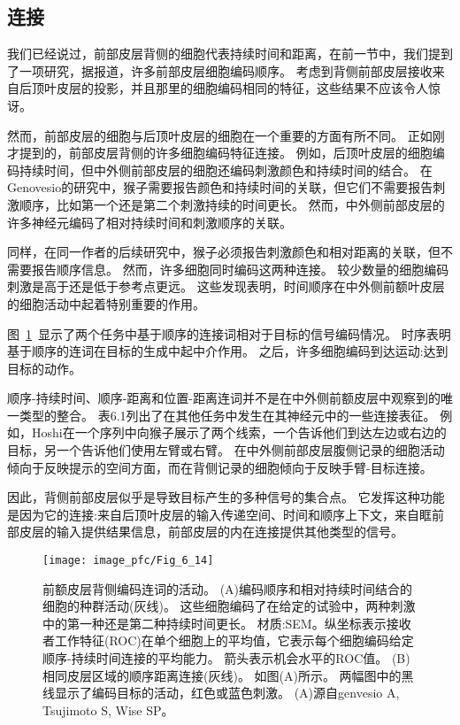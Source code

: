 \subsection{连接}

我们已经说过，前部皮层背侧的细胞代表持续时间和距离，在前一节中，我们提到了一项研究，据报道，许多前部皮层细胞编码顺序\cite{ninokura2003representation,genovesio2009feature}。
考虑到背侧前部皮层接收来自后顶叶皮层的投影，并且那里的细胞编码相同的特征，这些结果不应该令人惊讶\cite{tudusciuc2007neuronal,bueti2009parietal}。


然而，前部皮层的细胞与后顶叶皮层的细胞在一个重要的方面有所不同。
正如刚才提到的，前部皮层背侧的许多细胞编码特征连接。
例如，后顶叶皮层的细胞编码持续时间，但中外侧前部皮层的细胞还编码刺激颜色和持续时间的结合。
在Genovesio\cite{genovesio2009feature}的研究中，猴子需要报告颜色和持续时间的关联，但它们不需要报告刺激顺序，比如第一个还是第二个刺激持续的时间更长。
然而，中外侧前部皮层的许多神经元编码了相对持续时间和刺激顺序的关联。


同样，在同一作者\cite{genovesio2011prefrontal}的后续研究中，猴子必须报告刺激颜色和相对距离的关联，但不需要报告顺序信息。
然而，许多细胞同时编码这两种连接。
较少数量的细胞编码刺激是高于还是低于参考点更远。
这些发现表明，时间顺序在中外侧前额叶皮层的细胞活动中起着特别重要的作用。


图~\ref{fig:6_14}~显示了两个任务中基于顺序的连接词相对于目标的信号编码情况。
时序表明基于顺序的连词在目标的生成中起中介作用。
之后，许多细胞编码到达运动:达到目标的动作。


顺序-持续时间、顺序-距离和位置-距离连词并不是在中外侧前额皮层中观察到的唯一类型的整合。
表6.1列出了在其他任务中发生在其神经元中的一些连接表征。
例如，Hoshi\cite{hoshi2004area}在一个序列中向猴子展示了两个线索，一个告诉他们到达左边或右边的目标，另一个告诉他们使用左臂或右臂。
在中外侧前部皮层腹侧记录的细胞活动倾向于反映提示的空间方面，而在背侧记录的细胞倾向于反映手臂-目标连接。


因此，背侧前部皮层似乎是导致目标产生的多种信号的集合点。
它发挥这种功能是因为它的连接:来自后顶叶皮层的输入传递空间、时间和顺序上下文，来自眶前部皮层的输入提供结果信息，前部皮层的内在连接提供其他类型的信号。


\begin{figure}
	\centering
	\texttt{[image: image\_pfc/Fig\_6\_14]}
	\caption{前额皮层背侧编码连词的活动。
		(A)编码顺序和相对持续时间结合的细胞的种群活动(灰线)。
		这些细胞编码了在给定的试验中，两种刺激中的第一种还是第二种持续时间更长。
		材质:SEM。纵坐标表示接收者工作特征(ROC)在单个细胞上的平均值，它表示每个细胞编码给定顺序-持续时间连接的平均能力。
		箭头表示机会水平的ROC值。
		(B)相同皮层区域的顺序距离连接(灰线)。
		如图(A)所示。
		两幅图中的黑线显示了编码目标的活动，红色或蓝色刺激。
		(A)源自genvesio A, Tsujimoto S, Wise SP。}
	\label{fig:6_14}
\end{figure}



